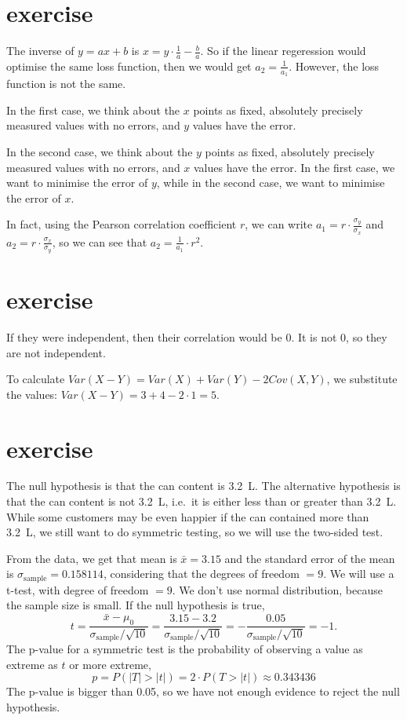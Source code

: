 \documentclass{article}
\begin{document}
\section{exercise}
The inverse of $y= a x + b$ is $x = y \cdot \frac{1}{a} - \frac{b}{a}$.
So if the linear regeression would optimise the same loss function,
then we would get $a_2 = \frac{1}{a_1}$.
However, the loss function is not the same.

In the first case,
we think about the $x$ points as fixed,
absolutely precisely measured values with no errors,
and $y$ values have the error.

In the second case,
we think about the $y$ points as fixed,
absolutely precisely measured values with no errors,
and $x$ values have the error.
In the first case, we want to minimise the error of $y$,
while in the second case, we want to minimise the error of $x$.

In fact, using the Pearson correlation coefficient $r$,
we can write $a_1 = r \cdot \frac{\sigma_y}{\sigma_x}$
and $a_2 = r \cdot \frac{\sigma_x}{\sigma_y}$,
so we can see that $a_2 = \frac{1}{a_1} \cdot r^2$.

\section{exercise}
If they were independent, then their correlation would be 0.
It is not 0, so they are not independent.

To calculate $Var(X-Y) = Var(X) + Var(Y) - 2Cov(X,Y)$,
we substitute the values:
$Var(X-Y) = 3 + 4 - 2 \cdot 1 = 5$.
\section{exercise}
The null hypothesis is that the can content is \qty{3.2}{\liter}.
The alternative hypothesis is that the can content is not \qty{3.2}{\liter},
i.e.\ it is either less than or greater than \qty{3.2}{\liter}.
While some customers may be even happier if the can contained more than \qty{3.2}{\liter},
we still want to do symmetric testing,
so we will use the two-sided test.

From the data, we get that mean is $\bar x = 3.15$
and the standard error of the mean is $\sigma_\text{sample} = 0.158114$,
considering that the degrees of freedom $=9$.
We will use a t-test, with degree of freedom $=9$.
We don't use normal distribution, because the sample size is small.
If the null hypothesis is true,
\[t = \frac{\bar x - \mu_0}{\sigma_\text{sample}/ \sqrt{10}} = \frac{3.15 - 3.2}{\sigma_\text{sample}/ \sqrt{10}} =  - \frac{0.05}{\sigma_\text{sample}/ \sqrt{10}} = -1.\]
The p-value for a symmetric test is the probability of
observing a value as extreme as $t$ or more extreme,
\[p = P(|T| > |t|) = 2 \cdot P(T > |t|) \approx 0.343436\]
The p-value is bigger than 0.05,
so we have not enough evidence to reject the null hypothesis.
\end{document}
